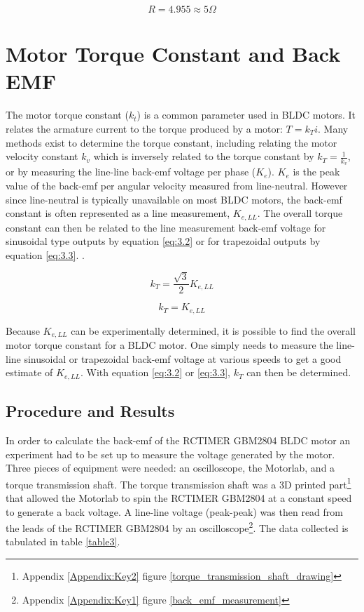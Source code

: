\begin{tcolorbox}[standard jigsaw,
	opacityback=0]
	\[R = 4.955 \approx 5 \Omega \]
	
\end{tcolorbox}

\section{Motor Torque Constant and Back EMF}
The motor torque constant (\(k_t\)) is a common parameter used in BLDC motors. It relates the armature current to the torque produced by a motor: \(T = k_T i \). Many methods exist to determine the torque constant, including relating the motor velocity constant \(k_v\) which is inversely related to the torque constant by \(k_T = \frac{1}{k_v} \), or by measuring the line-line back-emf voltage per phase (\(K_e\)). \(K_e\) is the peak value of the back-emf per angular velocity measured from line-neutral. However since line-neutral is typically unavailable on most BLDC motors, the back-emf constant is often represented as a line measurement, \(K_{e,LL}\). The overall torque constant can then be related to the line measurement back-emf voltage for sinusoidal type outputs by equation \ref{eq:3.2} or for trapezoidal outputs by equation \ref{eq:3.3}. \citep{5}. 

\begin{equation} \label{eq:3.2}
k_T = \frac{\sqrt{3}}{2} K_{e,LL}
\end{equation}

\begin{equation} \label{eq:3.3}
k_T = K_{e,LL}
\end{equation}

Because \(K_{e,LL}\) can be experimentally determined, it is possible to find the overall motor torque constant for a BLDC motor. One simply needs to measure the line-line sinusoidal or trapezoidal back-emf voltage at various speeds to get a good estimate of \(K_{e,LL}\). With equation \ref{eq:3.2} or \ref{eq:3.3}, \(k_T\) can then be determined.

\subsection{Procedure and Results}
In order to calculate the back-emf of the RCTIMER GBM2804 BLDC motor an experiment had to be set up to measure the voltage generated by the motor. Three pieces of equipment were needed: an oscilloscope, the Motorlab, and a torque transmission shaft. The torque transmission shaft was a 3D printed part\footnote{Appendix \ref{Appendix:Key2} figure \ref{torque_transmission_shaft_drawing}} that allowed the Motorlab to spin the RCTIMER GBM2804 at a constant speed to generate a back voltage. A line-line voltage (peak-peak) was then read from the leads of the RCTIMER GBM2804 by an oscilloscope\footnote{Appendix \ref{Appendix:Key1} figure \ref{back_emf_measurement}}. The data collected is tabulated in table \ref{table3}.

